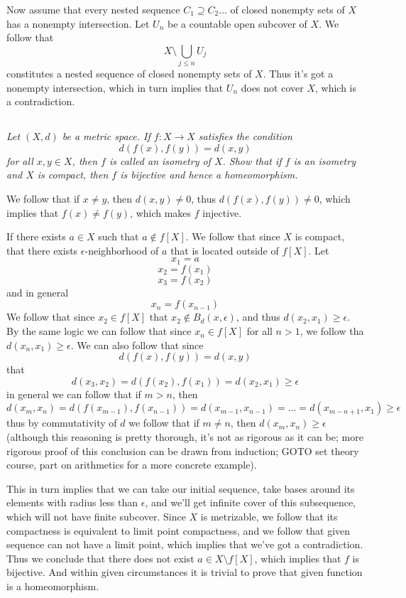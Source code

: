 \documentclass[11pt,oneside,titlepage]{book}
\begin{document}
Now assume that every nested sequence $C_1 \supseteq C_2 ... $ of closed nonempty sets of $X$
has a nonempty intersection. Let $U_n$ be a countable open subcover of $X$. We follow that
$$X \setminus \bigcup_{j \leq n}{U_j}$$
constitutes a nested sequence of closed nonempty sets of $X$. Thus it's got a nonempty
intersection, which in turn implies that $U_n$ does not cover $X$, which is a contradiction.

\subsection{}

\textit{Let $(X, d)$ be a metric space. If $f: X \to X$ satisfies the condition
  $$d(f(x), f(y)) = d(x, y)$$
  for all $x, y \in X$, then $f$ is called an isometry of $X$. Show that if $f$ is an
  isometry and $X$ is compact, then $f$ is bijective and hence a homeomorphism.}

We follow that if $x \neq y$, then $d(x, y) \neq 0$, thus $d(f(x), f(y)) \neq 0$, which
implies that $f(x) \neq f(y)$, which makes $f$ injective. 

If there exists $a \in X$ such that $a \notin f[X]$. We follow that since $X$ is compact, that
there exists $\epsilon$-neighborhood of $a$ that is located outside of $f[X]$.
Let
$$x_1 = a$$
$$x_2 = f(x_1)$$
$$x_3 = f(x_2)$$
and in general
$$x_n = f(x_{n - 1})$$
We follow that since $x_2 \in f[X]$ that $x_2 \notin B_d(x, \epsilon)$, and thus
$d(x_2, x_1) \geq \epsilon$. By the same logic we can follow that since $x_n \in f[X]$
for all $n > 1$, we follow tha $d(x_n, x_1) \geq \epsilon$.
We can also follow that since
$$d(f(x), f(y)) = d(x, y)$$
that
$$d(x_3, x_2) = d(f(x_2), f(x_1)) = d(x_2, x_1) \geq \epsilon$$
in general we can follow that if $m > n$, then
$$d(x_m, x_n) = d(f(x_{m - 1}), f(x_{n - 1})) = d(x_{m - 1}, x_{n - 1}) = ... = d(x_{m - n + 1}, x_1)
\geq \epsilon$$
thus by commutativity of $d$ we follow that if $m \neq n$, then $d(x_m, x_n) \geq \epsilon$
(although this reasoning is pretty thorough, it's not as rigorous as it can be; more rigorous
proof of this conclusion can be drawn from induction; GOTO set theory course, part on arithmetics
for a more concrete example).

This in turn implies that we can take our initial sequence, take bases around its elements
with radius less than $\epsilon$, and we'll get infinite cover of this subsequence,
which will not have finite subcover. Since $X$ is metrizable, we follow that its compactness
is equivalent to limit point compactness, and we follow that given sequence can
not have a limit point, which implies that we've got a contradiction. Thus we conclude that
there does not exist $a \in X \setminus f[X]$, which implies that $f$ is bijective.
And within given circumstances it is trivial to prove that given function is a homeomorphism.
\end{document}
